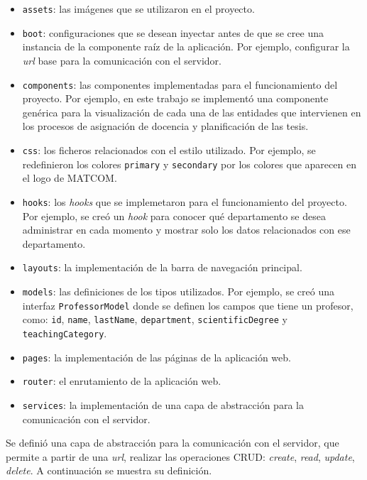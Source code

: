 \begin{itemize}
    \item \texttt{assets}: las imágenes que se utilizaron en el proyecto.
    \item \texttt{boot}: configuraciones que se desean inyectar antes de que se cree una instancia de la componente 
    raíz de la aplicación. Por ejemplo, configurar la \textit{url} base para la comunicación con el servidor. 
    \item \texttt{components}: las componentes implementadas para el funcionamiento del proyecto. 
    Por ejemplo, en este trabajo se implementó una componente genérica para la visualización de cada una de las entidades 
    que intervienen en los procesos de asignación de docencia y planificación de las tesis.  
    \item \texttt{css}: los ficheros relacionados con el estilo utilizado. Por ejemplo, se redefinieron los colores 
    \texttt{primary} y \texttt{secondary} por los colores que aparecen en el logo de MATCOM. 
    \item \texttt{hooks}: los \textit{hooks} que se implemetaron para el funcionamiento del proyecto.
    Por ejemplo, se creó un \textit{hook} para conocer qué departamento se desea administrar en cada momento 
    y mostrar solo los datos relacionados con ese departamento.
    \item \texttt{layouts}: la implementación de la barra de navegación principal.
    \item \texttt{models}: las definiciones de los tipos utilizados. Por ejemplo, se creó una interfaz \texttt{ProfessorModel} donde se definen los 
    campos que tiene un profesor, como: \texttt{id}, \texttt{name}, \texttt{lastName}, \texttt{department}, \texttt{scientificDegree} y \texttt{teachingCategory}.  
    \item \texttt{pages}: la implementación de las páginas de la aplicación web.
    \item \texttt{router}: el enrutamiento de la aplicación web.
    \item \texttt{services}: la implementación de una capa de abstracción para la comunicación con el servidor.
\end{itemize}


Se definió una capa de abstracción para la comunicación con 
el servidor, que permite a partir de una \textit{url}, realizar las operaciones CRUD: \textit{create}, \textit{read}, \textit{update}, \textit{delete}. 
A continuación se muestra su definición.



